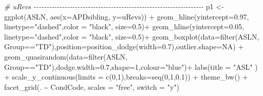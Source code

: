 \documentclass[a4paper, twoside]{templates/ociamthesis}
\newenvironment{Shaded}{\begin{snugshade}}{\end{snugshade}}
\newcommand{\AttributeTok}[1]{\textcolor[rgb]{0.77,0.63,0.00}{#1}}
\newcommand{\CommentTok}[1]{\textcolor[rgb]{0.56,0.35,0.01}{\textit{#1}}}
\newcommand{\ConstantTok}[1]{\textcolor[rgb]{0.00,0.00,0.00}{#1}}
\newcommand{\DecValTok}[1]{\textcolor[rgb]{0.00,0.00,0.81}{#1}}
\newcommand{\FloatTok}[1]{\textcolor[rgb]{0.00,0.00,0.81}{#1}}
\newcommand{\FunctionTok}[1]{\textcolor[rgb]{0.00,0.00,0.00}{#1}}
\newcommand{\NormalTok}[1]{#1}
\newcommand{\OtherTok}[1]{\textcolor[rgb]{0.56,0.35,0.01}{#1}}
\newcommand{\SpecialCharTok}[1]{\textcolor[rgb]{0.00,0.00,0.00}{#1}}
\newcommand{\StringTok}[1]{\textcolor[rgb]{0.31,0.60,0.02}{#1}}
\renewenvironment{Shaded}
{
  \vspace{4pt}%
  \begin{snugshade}%
}{%
  \end{snugshade}%
  \vspace{4pt}%
}
\begin{document}
\begin{Shaded}
\begin{Highlighting}[]
\CommentTok{\# uRevs {-}{-}{-}{-}{-}{-}{-}{-}{-}{-}{-}{-}{-}{-}{-}{-}{-}{-}{-}{-}{-}{-}{-}{-}{-}{-}{-}{-}{-}{-}{-}{-}{-}{-}{-}{-}{-}{-}{-}{-}{-}{-}{-}{-}{-}{-}{-}{-}{-}{-}{-}{-}{-}{-}{-}{-}{-}{-}{-}{-}{-}{-}{-}{-}{-}{-}}
\NormalTok{p1 }\OtherTok{\textless{}{-}} \FunctionTok{ggplot}\NormalTok{(ASLN, }\FunctionTok{aes}\NormalTok{(}\AttributeTok{x=}\NormalTok{APDsibling, }\AttributeTok{y=}\NormalTok{uRevs)) }\SpecialCharTok{+}
  \FunctionTok{geom\_hline}\NormalTok{(}\AttributeTok{yintercept=}\FloatTok{0.97}\NormalTok{, }\AttributeTok{linetype=}\StringTok{"dashed"}\NormalTok{,}\AttributeTok{color =} \StringTok{"black"}\NormalTok{, }\AttributeTok{size=}\FloatTok{0.5}\NormalTok{)}\SpecialCharTok{+}
  \FunctionTok{geom\_hline}\NormalTok{(}\AttributeTok{yintercept=}\FloatTok{0.05}\NormalTok{, }\AttributeTok{linetype=}\StringTok{"dashed"}\NormalTok{,}\AttributeTok{color =} \StringTok{"black"}\NormalTok{, }\AttributeTok{size=}\FloatTok{0.5}\NormalTok{)}\SpecialCharTok{+}
  \FunctionTok{geom\_boxplot}\NormalTok{(}\AttributeTok{data=}\FunctionTok{filter}\NormalTok{(ASLN, Group}\SpecialCharTok{==}\StringTok{"TD"}\NormalTok{),}\AttributeTok{position=}\FunctionTok{position\_dodge}\NormalTok{(}\AttributeTok{width=}\FloatTok{0.7}\NormalTok{),}\AttributeTok{outlier.shape=}\ConstantTok{NA}\NormalTok{) }\SpecialCharTok{+}
  \FunctionTok{geom\_quasirandom}\NormalTok{(}\AttributeTok{data=}\FunctionTok{filter}\NormalTok{(ASLN, Group}\SpecialCharTok{==}\StringTok{"TD"}\NormalTok{),}\AttributeTok{dodge.width=}\FloatTok{0.7}\NormalTok{,}\AttributeTok{shape=}\DecValTok{1}\NormalTok{,}\AttributeTok{colour=}\StringTok{"blue"}\NormalTok{)}\SpecialCharTok{+}
  \FunctionTok{labs}\NormalTok{(}\AttributeTok{title =} \StringTok{"ASL"}\NormalTok{ ) }\SpecialCharTok{+} 
  \FunctionTok{scale\_y\_continuous}\NormalTok{(}\AttributeTok{limits =} \FunctionTok{c}\NormalTok{(}\DecValTok{0}\NormalTok{,}\DecValTok{1}\NormalTok{),}\AttributeTok{breaks=}\FunctionTok{seq}\NormalTok{(}\DecValTok{0}\NormalTok{,}\DecValTok{1}\NormalTok{,}\FloatTok{0.1}\NormalTok{)) }\SpecialCharTok{+}
  \FunctionTok{theme\_bw}\NormalTok{() }\SpecialCharTok{+}
  \FunctionTok{facet\_grid}\NormalTok{(. }\SpecialCharTok{\textasciitilde{}}\NormalTok{ CondCode, }\AttributeTok{scales =} \StringTok{"free"}\NormalTok{, }\AttributeTok{switch =} \StringTok{"y"}\NormalTok{)}


\end{Highlighting}
\end{Shaded}
\end{document}
